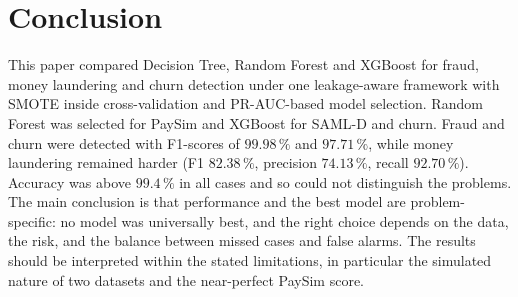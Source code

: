 \documentclass[10pt,twocolumn,a4paper]{article}
\newcommand{\pct}{\,\%}
\begin{document}
\section{Conclusion}
This paper compared Decision Tree, Random Forest and XGBoost for fraud, money laundering and churn detection under one leakage-aware framework with SMOTE inside cross-validation and PR-AUC-based model selection. Random Forest was selected for PaySim and XGBoost for SAML-D and churn. Fraud and churn were detected with F1-scores of $99.98\pct$ and $97.71\pct$, while money laundering remained harder (F1 $82.38\pct$, precision $74.13\pct$, recall $92.70\pct$). Accuracy was above $99.4\pct$ in all cases and so could not distinguish the problems. The main conclusion is that performance and the best model are problem-specific: no model was universally best, and the right choice depends on the data, the risk, and the balance between missed cases and false alarms. The results should be interpreted within the stated limitations, in particular the simulated nature of two datasets and the near-perfect PaySim score.
\clearpage
\begingroup
\small
\renewcommand{\refname}{\centering\normalfont\small\scshape References}
\end{document}
